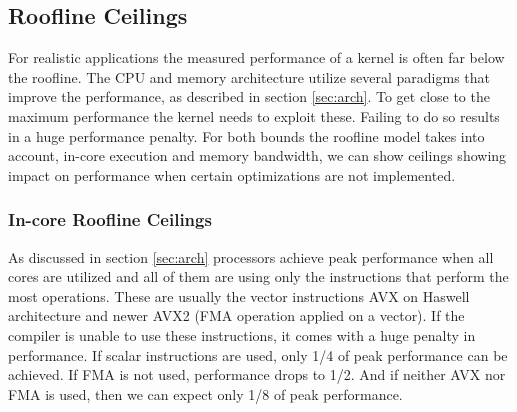 \subsection{Roofline Ceilings}

For realistic applications the measured performance of a kernel is often far below the roofline. The CPU and memory architecture utilize several paradigms that improve the performance, as described in section \ref{sec:arch}. To get close to the maximum performance the kernel needs to exploit these. Failing to do so results in a huge performance penalty.
For both bounds the roofline model takes into account, in-core execution and memory bandwidth, we can show ceilings showing impact on performance when certain optimizations are not implemented.

\subsubsection*{In-core Roofline Ceilings}


As discussed in section \ref{sec:arch} processors achieve peak performance when all cores are utilized and all of them are using only the instructions that perform the most operations. These are usually the vector instructions AVX on Haswell architecture and newer AVX2 (FMA operation applied on a vector).
If the compiler is unable to use these instructions, it comes with a huge penalty in performance. If scalar instructions are used, only 1/4 of peak performance can be achieved. If FMA is not used, performance drops to 1/2. And if neither AVX nor FMA is used, then we can expect only 1/8 of peak performance.


